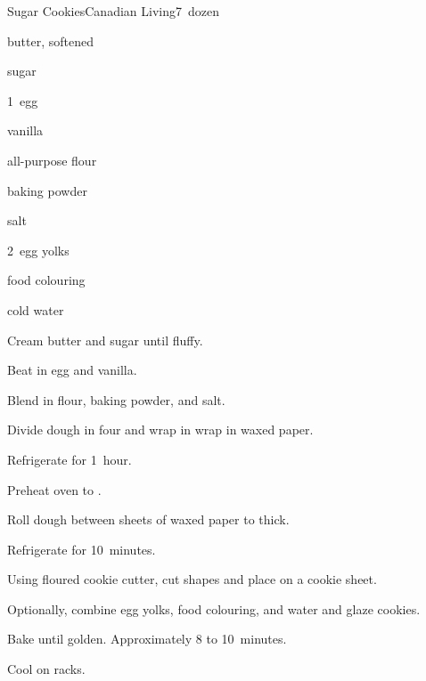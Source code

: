 \begin{recipe}{Sugar Cookies}{Canadian Living}{7~dozen}

\begin{ingredients}
\item {} butter, softened
\item {} sugar
\item 1~egg
\item \tp{\half} vanilla
\item {} all-purpose flour
\item \tp{1\half} baking powder
\item \tp{\quarter} salt
\item 2~egg yolks
\item food colouring
\item \tp{\half} cold water
\end{ingredients}

\begin{directions}
\item Cream butter and sugar until fluffy.
\item Beat in egg and vanilla.
\item Blend in flour, baking powder, and salt.
\item Divide dough in four and wrap in wrap in waxed paper.
\item Refrigerate for 1~hour.
\item Preheat oven to .
\item Roll dough between sheets of waxed paper to \inch{\eighth} thick.
\item Refrigerate for 10~minutes.
\item Using floured cookie cutter, cut shapes and place on a cookie sheet.
\item Optionally, combine egg yolks, food colouring, and water and glaze cookies.
\item Bake until golden. Approximately 8 to 10~minutes.
\item Cool on racks.
\end{directions}
\end{recipe}
